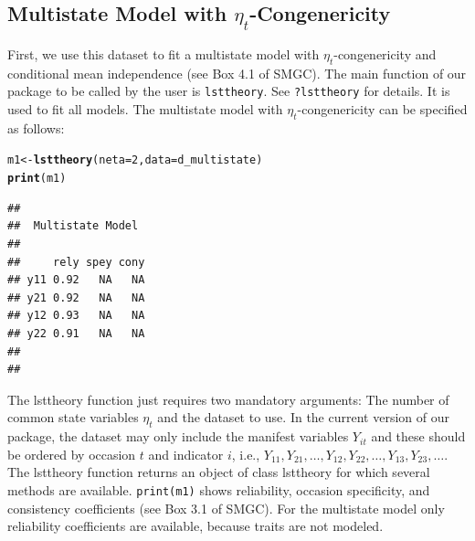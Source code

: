 \documentclass[10pt]{article}\usepackage[]{graphicx}\usepackage[]{xcolor}
\makeatletter
\newcommand{\hlnum}[1]{\textcolor[rgb]{0.686,0.059,0.569}{#1}}%
\newcommand{\hlstd}[1]{\textcolor[rgb]{0.345,0.345,0.345}{#1}}%
\newcommand{\hlkwb}[1]{\textcolor[rgb]{0.69,0.353,0.396}{#1}}%
\newcommand{\hlkwc}[1]{\textcolor[rgb]{0.333,0.667,0.333}{#1}}%
\newcommand{\hlkwd}[1]{\textcolor[rgb]{0.737,0.353,0.396}{\textbf{#1}}}%
\newenvironment{kframe}{%
 \def\at@end@of@kframe{}%
 \ifinner\ifhmode%
  \def\at@end@of@kframe{\end{minipage}}%
  \begin{minipage}{\columnwidth}%
 \fi\fi%
 \def\FrameCommand##1{\hskip\@totalleftmargin \hskip-\fboxsep
 \colorbox{shadecolor}{##1}\hskip-\fboxsep
     \hskip-\linewidth \hskip-\@totalleftmargin \hskip\columnwidth}%
 \MakeFramed {\advance\hsize-\width
   \@totalleftmargin\z@ \linewidth\hsize
   \@setminipage}}%
 {\par\unskip\endMakeFramed%
 \at@end@of@kframe}
\newenvironment{knitrout}{}{} %
\makeatother
\begin{document}
\subsection{Multistate Model with $\eta_t$-Congenericity}

First, we use this dataset to fit a multistate model with $\eta_t$-congenericity and conditional mean independence (see Box 4.1 of SMGC). The main function of our package to be called by the user is \texttt{lsttheory}. See \texttt{?lsttheory} for details. It is used to fit all models. The multistate model with $\eta_t$-congenericity can be specified as follows:


%
\begin{knitrout}
\color{fgcolor}\begin{kframe}
\begin{alltt}
\hlstd{m1} \hlkwb{<-} \hlkwd{lsttheory}\hlstd{(}\hlkwc{neta}\hlstd{=}\hlnum{2}\hlstd{,} \hlkwc{data}\hlstd{=d_multistate)}
\hlkwd{print}\hlstd{(m1)}
\end{alltt}
\begin{verbatim}
## 
##  Multistate Model 
##  
##     rely spey cony
## y11 0.92   NA   NA
## y21 0.92   NA   NA
## y12 0.93   NA   NA
## y22 0.91   NA   NA
## 
## 
\end{verbatim}
\end{kframe}
\end{knitrout}
%

The lsttheory function just requires two mandatory arguments: The number of common state variables $\eta_t$ and the dataset to use. In the current version of our package, the dataset may only include the manifest variables $Y_{it}$ and these should be ordered by occasion $t$ and indicator $i$, i.e., $Y_{11}, Y_{21}, \ldots, Y_{12}, Y_{22}, \ldots, Y_{13}, Y_{23}, \ldots$. The lsttheory function returns an object of class lsttheory for which several methods are available. \texttt{print(m1)} shows reliability, occasion specificity, and consistency coefficients (see Box 3.1 of SMGC). For the multistate model only reliability coefficients are available, because traits are not modeled.
\end{document}
